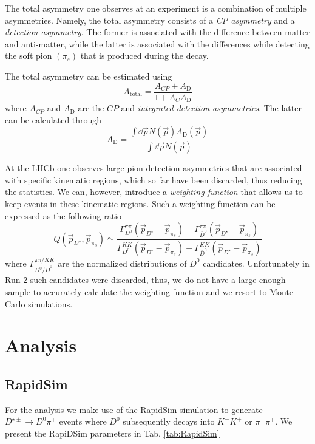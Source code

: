 \documentclass{article}
\begin{document}
        The total asymmetry one observes at an experiment is a combination of multiple asymmetries.
        Namely, the total asymmetry consists of a \textit{CP asymmetry} and a \textit{detection asymmetry}.
        The former is associated with the difference between matter and anti-matter, while the latter is associated with the differences while detecting the soft pion $(\pi_s)$ that is produced during the decay.

        The total asymmetry can be estimated using 
        \begin{equation}
                \label{eq:total}
                A_\text{total} = \frac{A_{CP} + A_\text{D}}{1 + A_{C}A_\text{D}}
        \end{equation}
        where $A_{CP}$ and $A_\text{D}$ are the $CP$ and \textit{integrated detection asymmetries}.
        The latter can be calculated through
        \begin{equation}
                A_\text{D} = \frac{\int \dd \vec{p} N(\vec{p})A_\text{D}(\vec{p})}{\int \dd \vec{p} N(\vec{p})}
        \end{equation}


        At the LHCb one observes large pion detection asymmetries that are associated with specific kinematic regions, which so far have been discarded, thus reducing the statistics.
        We can, however, introduce a \textit{weighting function} that allows us to keep events in these kinematic regions.
        Such a weighting function can be expressed as the following ratio
        \begin{equation}
                \label{eq:weighting}
                Q(\vec{p}_{D^\star}, \vec{p}_{\pi_s}) \simeq \frac{\Gamma_{D^0}^{\pi\pi}(\vec{p}_{D^\star} - \vec{p}_{\pi_s}) + \Gamma_{\bar{D}^0}^{\pi\pi}(\vec{p}_{D^\star} - \vec{p}_{\pi_s})}{\Gamma_{D^0}^{KK}(\vec{p}_{D^\star} - \vec{p}_{\pi_s}) + \Gamma_{\bar{D}^0}^{KK}(\vec{p}_{D^\star} - \vec{p}_{\pi_s})}
        \end{equation}
        where $\Gamma_{D^{0}/\bar{D}^0}^{\pi\pi/KK}$ are the normalized distributions of $D^0$ candidates.
        Unfortunately in Run-2 such candidates were discarded, thus, we do not have a large enough sample to accurately calculate the weighting function and we resort to Monte Carlo simulations.

        
        \section{Analysis}
        \subsection{RapidSim}
        For the analysis we make use of the RapidSim simulation \cite{Cowan:2016tnm} to generate $D^{\star \pm}\to D^0 \pi^\pm$ events where $D^0$ subsequently decays into $K^-K^+$ or $\pi^-\pi^+$.
        We present the RapiDSim parameters in Tab. \ref{tab:RapidSim}
\end{document}

